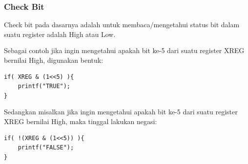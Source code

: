 \documentclass[12pt,]{article}
\begin{document}
	\subsubsection{Check Bit}
	
	Check bit pada dasarnya adalah untuk membaca/mengetahui status bit dalam suatu register adalah High atau Low.
	
	Sebagai contoh jika ingin mengetahui apakah bit ke-5 dari suatu register XREG bernilai High, digunakan bentuk:
	
	\begin{verbatim}
if( XREG & (1<<5) ){
	printf("TRUE");
}
	\end{verbatim}
	
	Sedangkan misalkan jika ingin mengetahui apakah bit ke-5 dari suatu register XREG bernilai High, maka tinggal lakukan negasi:
	\begin{verbatim}
if( !(XREG & (1<<5)) ){
	printf("FALSE");
}
	\end{verbatim}
	
\end{document}

